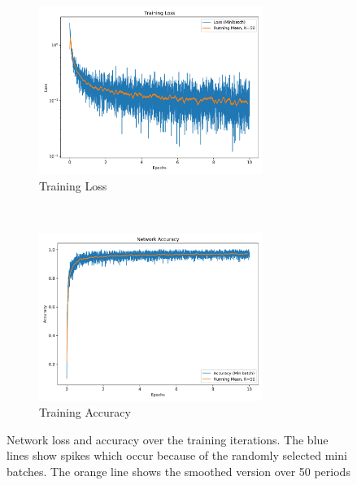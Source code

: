 \begin{figure}[hbtp]
\centering
\begin{subfigure}[t]{0.5\textwidth}
	\includegraphics[width=0.8\textwidth]{../../net/images/training_loss}
	\caption{Training Loss}		
	\label{fig:network-train-loss}
\end{subfigure}%
~
\begin{subfigure}[t]{0.5\textwidth}
	\includegraphics[width=0.8\textwidth]{../../net/images/training_accuracy}
	\caption{Training Accuracy}
	\label{fig:network-train-acc}		
\end{subfigure}
\caption[Network loss and accuracy over the training iterations]{Network loss and accuracy over the training iterations. The blue lines show spikes which occur because of the randomly selected mini batches. The orange line shows the smoothed version over 50 periods}
\label{fig:network-training-graphs}
\end{figure}

